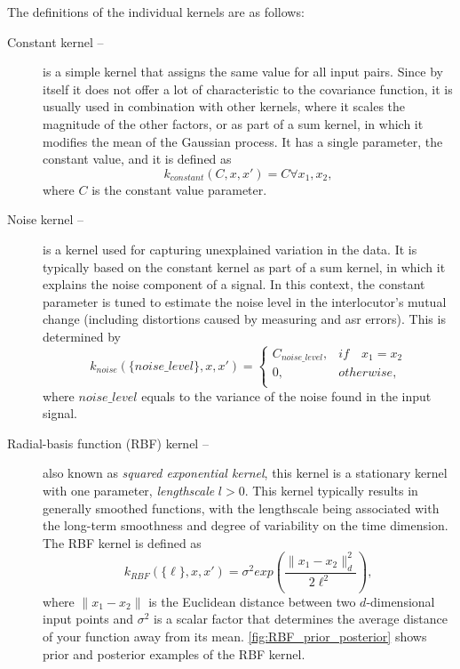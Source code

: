 The definitions of the individual kernels are as follows:

\begin{description}
	\item[Constant kernel -- ]
	is a simple kernel that assigns the same value for all input pairs.
	Since by itself it does not offer a lot of characteristic to the covariance function, it is usually used in combination with other kernels, where it scales the magnitude of the other factors, or as part of a sum kernel, in which it modifies the mean of the Gaussian process.
	It has a single parameter, the constant value, and it is defined as 
	\begin{equation}
		\label{eq:constant_kernel}
		k_{constant}(C, x, x') = C\forall x_1, x_2,
	\end{equation}
	where $C$ is the constant value parameter.
	
	\item[Noise kernel -- ]
	is a kernel used for capturing unexplained variation in the data.
	It is typically based on the constant kernel as part of a sum kernel, in which it explains the noise component of a signal.
	In this context, the constant parameter is tuned to estimate the noise level in the interlocutor's mutual change (including distortions caused by measuring and \ac{asr} errors).
	This is determined by
	\begin{equation}
		\label{eq:noise_kernel}
		k_{noise}(\{noise\_level\}, x, x') =
		\begin{cases}
		C_{noise\_level}, & if\quad x_1 = x_2\\
		0, & otherwise,\\
		\end{cases}
	\end{equation}
	where $noise\_level$ equals to the variance of the noise found in the input signal.
	
	\item[Radial-basis function (RBF) kernel --]
	also known as \emph{squared exponential kernel}, this kernel is a stationary kernel with one parameter, \emph{lengthscale} $l > 0$.
	This kernel typically results in generally smoothed functions, with the lengthscale being associated with the long-term smoothness and degree of variability on the time dimension.
	The RBF kernel is defined as
	\begin{equation}
		\label{eq:RBF_kernel}
		k_{RBF}(\{\ell\}, x, x') = \sigma^2 exp\left(\frac{\lVert x_1 - x_2 \lVert ^2_d}{2\ell^2}\right),
	\end{equation}
	where $\lVert x_1 - x_2 \lVert$ is the Euclidean distance between two $d$-dimensional input points and $\sigma^2$ is a scalar factor that determines the average distance of your function away from its mean.
	\cref{fig:RBF_prior_posterior} shows prior and posterior examples of the RBF kernel.
	

\end{description}
